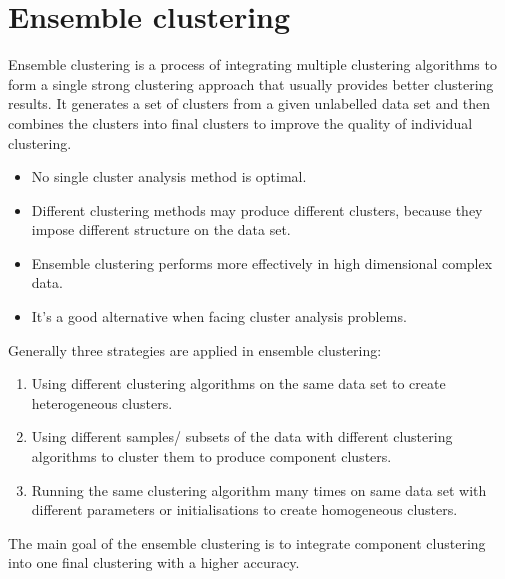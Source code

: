 \section{Ensemble clustering}
Ensemble clustering is a process of integrating multiple clustering algorithms to form a single strong clustering approach that usually provides better clustering results. It generates a set of clusters from a given unlabelled data set and then combines the clusters into final clusters to improve the quality of individual clustering.
\begin{itemize}
    \item No single cluster analysis method is optimal.
    \item Different clustering methods may produce different clusters, because they impose different structure on the data set.
    \item Ensemble clustering performs more effectively in high dimensional complex data.
    \item It’s a good alternative when facing cluster analysis problems.
\end{itemize}
Generally three strategies are applied in ensemble clustering: 
\begin{enumerate}
    \item Using different clustering algorithms on the same data set to create heterogeneous clusters.
    \item Using different samples/ subsets of the data with different clustering algorithms to cluster them to produce component clusters.
    \item Running the same clustering algorithm many times on same data set with different parameters or initialisations to create homogeneous clusters.
\end{enumerate}
The main goal of the ensemble clustering is to integrate component clustering into one final clustering with a higher accuracy.

